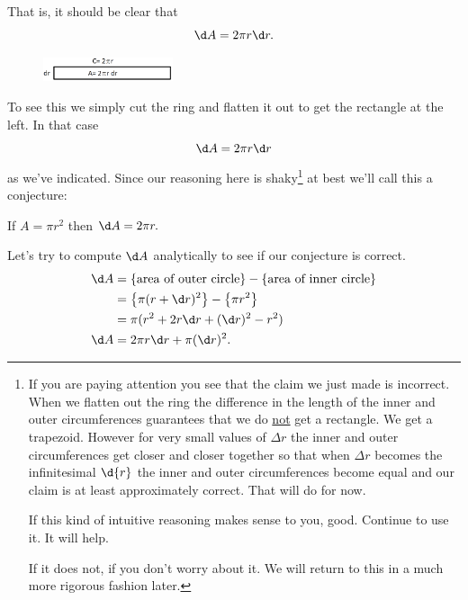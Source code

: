 That is, it should be clear that
\begin{equation*}
\d A = 2\pi r\d r.%
\end{equation*}
\begin{figure}
\captionsetup{labelformat=empty}
\centerline{\includegraphics*[height=.4in,width=1.5in]{Figures/CutCircleDiff}}
\label{fig:}
\end{figure}

To see this we simply cut the ring and flatten it out to get the
rectangle at the left.
In that case
$$
\d A = 2\pi r\d r
$$
as we've indicated.
Since our reasoning here is  shaky\footnote{ If you are paying attention you see that
  the claim we just made is incorrect. When we flatten out the ring
  the difference in the length of the inner and outer circumferences
  guarantees that we do \underline{not} get a rectangle. We get a
  trapezoid. However for very small values of $\Delta r$ the inner and
  outer circumferences get closer and closer together so that when
  $\Delta r$ becomes the infinitesimal $\d{r}$ the inner and outer
  circumferences become equal and our claim is at least approximately
  correct. That will do for now.

  If this kind of intuitive reasoning makes sense to you,
  good. Continue to use it. It will help.

  If it does not, if you don't worry about it. We will return to this in a
  much more rigorous fashion later.} at best we'll call this a
conjecture:
\begin{myconjecture}
  If $A=\pi r^2$ then $\d A = 2\pi r.$
\end{myconjecture}


Let's try to compute $\d A$ analytically to see if our conjecture is
correct.
\begin{align}
  \d A &= \left\{\text{area of outer circle}\right\} -\left\{\text{area of inner circle}\right\}\nonumber\\
     &= \left\{\pi(r+\d r)^2\right\} - \left\{\pi r^2\right\}\nonumber\\
     &= \pi(r^2+2r\d r + (\d r)^2 -r^2)\nonumber\\
\d A &=2\pi r\d r+ \pi(\d r)^2.\label{eq:CircDiffAnal}
\end{align}

